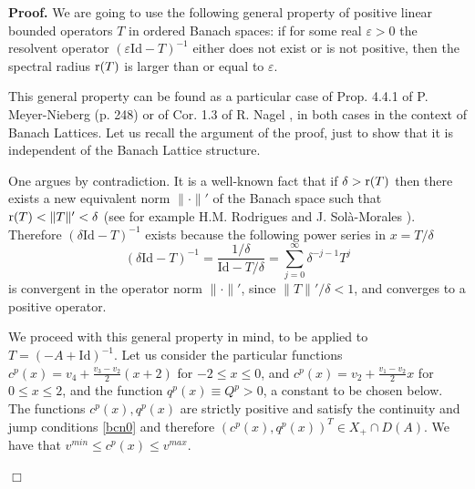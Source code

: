 \documentclass[a4paper]{article}
\def\Id{\rm{Id}}
\def\r{{\rm{r}}}
\def\Id{\mathrm{Id}}
\numberwithin{equation}{section}
\newenvironment{pf}{\vspace{0.5em}\noindent\textbf{Proof.} }{\quad \hfill $\Box$ \\ \vspace{0.2em}\\}
\begin{document}
\begin{pf}
We are going to use the following general property of positive linear bounded operators $T$ in ordered Banach spaces:  if for some real $\varepsilon>0$ the resolvent operator $(\varepsilon\Id-T)^{-1}$ either does not exist or is not positive, then the spectral radius $\r(T)$ is larger than or equal to $\varepsilon$.

This general property can be found as a particular case of Prop. 4.4.1 of P. Meyer-Nieberg \cite{Meyer} (p. 248) or of Cor. 1.3 of R. Nagel \cite{Nagel}, in both cases in the context of Banach Lattices. Let us recall the argument of the proof, just to show that it is independent of the Banach Lattice structure.

One argues by contradiction. It is a well-known fact that if $\delta>\r(T)$ then there exists a new equivalent norm $\|\cdot\|'$ of the Banach space such that $\r(T)<\|T\|'<\delta$ (see for example H.M. Rodrigues and J. Sol\`a-Morales \cite{Hildeb}). Therefore $(\delta\Id-T)^{-1}$ exists because the following power series in $x=T/\delta$
$$(\delta\Id-T)^{-1}=\dfrac{1/\delta}{\Id-T/\delta}=\sum_{j=0}^\infty \delta^{-j-1}T^j$$
is convergent in the operator norm $\|\cdot\|'$, since $\|T\|'/\delta <1$, and converges to a positive operator.

We proceed with this general property in mind, to be applied to $T=(-A+\Id)^{-1}$. Let us consider the particular functions $c^p(x)=v_4+\frac{v_3-v_2}{2}(x+2)$ for $-2\le x\le 0$, and $c^p(x)=v_2+\frac{v_1-v_2}{2}x$ for $0\le x\le 2$, and the function $q^p(x)\equiv Q^p>0$, a constant to be chosen below. The functions $c^p(x),q^p(x)$ are strictly positive and satisfy the continuity and jump conditions \eqref{bcn0}  and therefore $(c^p(x),q^p(x))^T\in X_+\cap D(A)$. We have that $v^{min}\le c^p(x)\le v^{max}$.



\end{pf}
\end{document}
